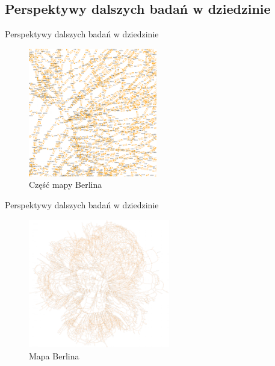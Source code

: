 \documentclass{beamer}
\begin{document}
\subsection{Perspektywy dalszych badań w dziedzinie}
\begin{frame}{Perspektywy dalszych badań w dziedzinie} 

\begin{figure}[h!]
\includegraphics[width=0.50\textwidth]{img/berlin}
\caption{Część mapy Berlina}
\end{figure}

\end{frame}

\begin{frame}{Perspektywy dalszych badań w dziedzinie} 

\begin{figure}[h!]
\includegraphics[width=0.55\textwidth]{img/berlin2}
\caption{Mapa Berlina}
\end{figure}

\end{frame}
\end{document}
